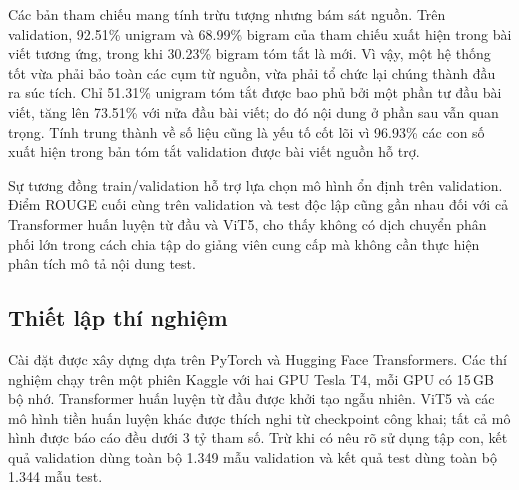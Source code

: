 \documentclass[conference]{IEEEtran}
\begin{document}
\begin{table}[htbp]
\centering
\caption{Đặc trưng bài viết--tóm tắt trên train và validation.}
\label{tab:dataset_overlap}
\end{table}

Các bản tham chiếu mang tính trừu tượng nhưng bám sát nguồn. Trên validation, 92.51\% unigram và 68.99\% bigram của tham chiếu xuất hiện trong bài viết tương ứng, trong khi 30.23\% bigram tóm tắt là mới. Vì vậy, một hệ thống tốt vừa phải bảo toàn các cụm từ nguồn, vừa phải tổ chức lại chúng thành đầu ra súc tích. Chỉ 51.31\% unigram tóm tắt được bao phủ bởi một phần tư đầu bài viết, tăng lên 73.51\% với nửa đầu bài viết; do đó nội dung ở phần sau vẫn quan trọng. Tính trung thành về số liệu cũng là yếu tố cốt lõi vì 96.93\% các con số xuất hiện trong bản tóm tắt validation được bài viết nguồn hỗ trợ.

Sự tương đồng train/validation hỗ trợ lựa chọn mô hình ổn định trên validation. Điểm ROUGE cuối cùng trên validation và test độc lập cũng gần nhau đối với cả Transformer huấn luyện từ đầu và ViT5, cho thấy không có dịch chuyển phân phối lớn trong cách chia tập do giảng viên cung cấp mà không cần thực hiện phân tích mô tả nội dung test.
\subsection{Thiết lập thí nghiệm}
Cài đặt được xây dựng dựa trên PyTorch và Hugging Face Transformers. Các thí nghiệm chạy trên một phiên Kaggle với hai GPU Tesla T4, mỗi GPU có 15\,GB bộ nhớ. Transformer huấn luyện từ đầu được khởi tạo ngẫu nhiên. ViT5 và các mô hình tiền huấn luyện khác được thích nghi từ checkpoint công khai; tất cả mô hình được báo cáo đều dưới 3 tỷ tham số. Trừ khi có nêu rõ sử dụng tập con, kết quả validation dùng toàn bộ 1.349 mẫu validation và kết quả test dùng toàn bộ 1.344 mẫu test.
\end{document}
